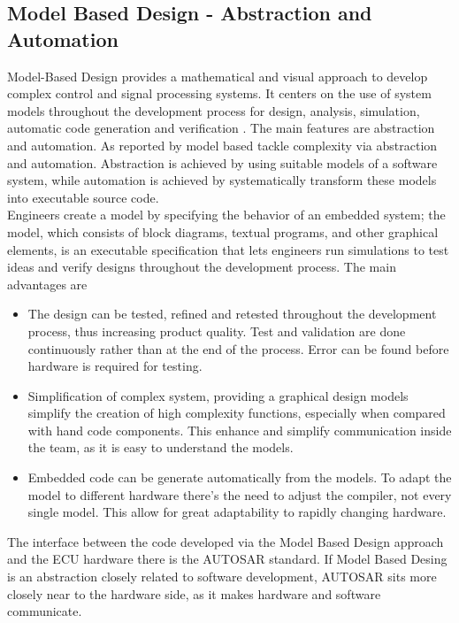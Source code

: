 \documentclass[../main.tex]{subfiles}
\begin{document}
\subsection{Model Based Design - Abstraction and Automation}
Model-Based Design provides a mathematical and visual approach to develop complex control and signal processing systems. It centers on the use of system models throughout the development process for design, analysis, simulation, automatic code generation and verification \cite{Mathworks}. The main features are abstraction and automation. As reported by \cite{modelbased} model based tackle complexity via abstraction and automation. Abstraction is achieved by using suitable models of a software system, while automation is achieved by systematically transform these models into executable source code.\\
Engineers create a model by specifying the behavior of an embedded system; the model, which consists of block diagrams, textual programs, and other graphical elements, is an executable specification that lets engineers run simulations to test ideas and verify designs throughout the development process. The main advantages are
\begin{itemize}
    \item The design can be tested, refined and retested throughout the development process, thus increasing product quality. Test and validation are done continuously rather than at the end of the process. Error can be found before hardware is required for testing.
    \item Simplification of complex system, providing a graphical design models simplify the creation of high complexity functions, especially when compared with hand code components. This enhance and simplify communication inside the team, as it is easy to understand the models. 
    \item Embedded code can be generate automatically from the models. To adapt the model to different hardware there's the need to adjust the compiler, not every single model. This allow for great adaptability to rapidly changing hardware. 
\end{itemize}
The interface between the code developed via the Model Based Design approach and the \gls{ECU} hardware there is the \gls{AUTOSAR} standard. If Model Based Desing is an abstraction closely related to software development, \gls{AUTOSAR} sits more closely near to the hardware side, as it makes hardware and software communicate.
\end{document}
